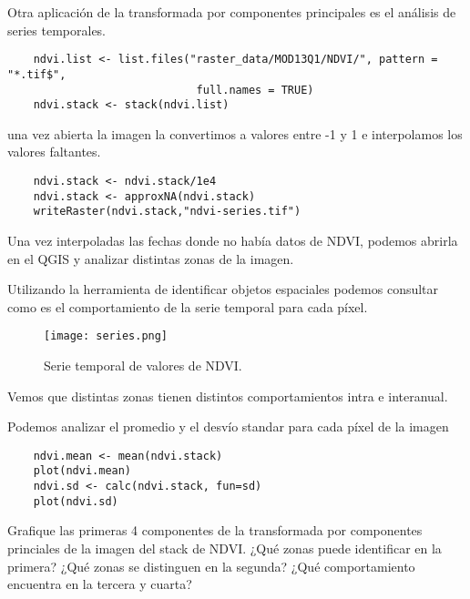 \begin{exa}
    Otra aplicaci\'on de la transformada por componentes principales
    es el an\'alisis de series temporales.
    \begin{lstlisting}
    ndvi.list <- list.files("raster_data/MOD13Q1/NDVI/", pattern = "*.tif$",
                             full.names = TRUE)
    ndvi.stack <- stack(ndvi.list)
    \end{lstlisting}
    una vez abierta la imagen la convertimos a valores entre -1 y 1 e
    interpolamos los valores faltantes.
    \begin{lstlisting}
    ndvi.stack <- ndvi.stack/1e4
    ndvi.stack <- approxNA(ndvi.stack)
    writeRaster(ndvi.stack,"ndvi-series.tif")
    \end{lstlisting}
    Una vez interpoladas las fechas donde no hab\'ia datos de NDVI, podemos
    abrirla en el QGIS y analizar distintas zonas de la imagen.

    Utilizando la herramienta de identificar objetos espaciales podemos
    consultar como es el comportamiento de la serie temporal para cada p\'ixel.

    \begin{figure}[h!]
    \begin{center}
        \texttt{[image: series.png]}
    \end{center}
    \caption{Serie temporal de valores de NDVI.}
    \label{fig:series}
    \end{figure}

    Vemos que distintas zonas tienen distintos comportamientos intra e
    interanual.

    Podemos analizar el promedio y el desv\'io standar para cada p\'ixel de la
    imagen
    \begin{lstlisting}
    ndvi.mean <- mean(ndvi.stack)
    plot(ndvi.mean)
    ndvi.sd <- calc(ndvi.stack, fun=sd)
    plot(ndvi.sd)
    \end{lstlisting}
\end{exa}


\begin{act}
    Grafique las primeras 4 componentes de la transformada por componentes
    princiales de la imagen del stack de NDVI\@. ¿Qu\'e zonas puede identificar en la
    primera? ¿Qu\'e zonas se distinguen en la segunda? ¿Qu\'e comportamiento encuentra
    en la tercera y cuarta?
\end{act}
